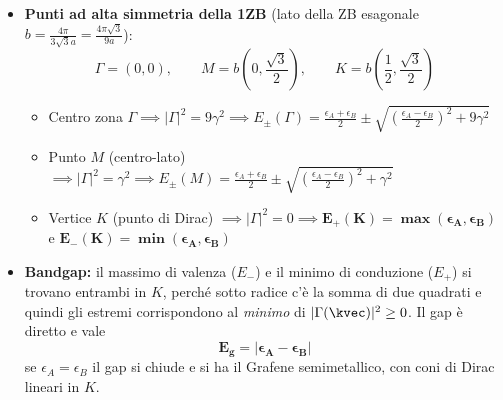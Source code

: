 \begin{itemize}
    \setlength{\itemsep}{1pt}
    \item \textbf{Punti ad alta simmetria della 1ZB} (lato della ZB esagonale $b = \frac{4\pi}{3\sqrt3 a} = \frac{4\pi\sqrt3}{9a}$):
    \[ \Gamma=(0,0), \qquad M = b\left(0,\frac{\sqrt3}{2}\right), \qquad K = b\left(\frac12,\frac{\sqrt3}{2}\right) \]
    \begin{itemize}
        \item Centro zona $\Gamma \implies |\Gamma|^2 = 9\gamma^2 \implies E_\pm(\Gamma)=\frac{\epsilon_A+\epsilon_B}{2}\pm\sqrt{\left(\frac{\epsilon_A-\epsilon_B}{2}\right)^2+9\gamma^2}$
        \item Punto $M$ (centro-lato) $\implies |\Gamma|^2 = \gamma^2 \implies E_\pm(M)=\frac{\epsilon_A+\epsilon_B}{2}\pm\sqrt{\left(\frac{\epsilon_A-\epsilon_B}{2}\right)^2+\gamma^2}$
        \item Vertice $K$ (punto di Dirac) $\implies |\Gamma|^2 = 0 \implies \bm{E_+(K)=\max(\epsilon_A,\epsilon_B)}$ e $\bm{E_-(K)=\min(\epsilon_A,\epsilon_B)}$
    \end{itemize}
    \item \textbf{Bandgap:} il massimo di valenza ($E_-$) e il minimo di conduzione ($E_+$) si trovano entrambi in $K$, perché sotto radice c'è la somma di due quadrati e quindi gli estremi corrispondono al \emph{minimo} di $|\Gamma(\kvec)|^2\ge0$. Il gap è diretto e vale
    \[ \bm{E_g = |\epsilon_A-\epsilon_B|} \]
    se $\epsilon_A=\epsilon_B$ il gap si chiude e si ha il Grafene semimetallico, con coni di Dirac lineari in $K$.
\end{itemize}

